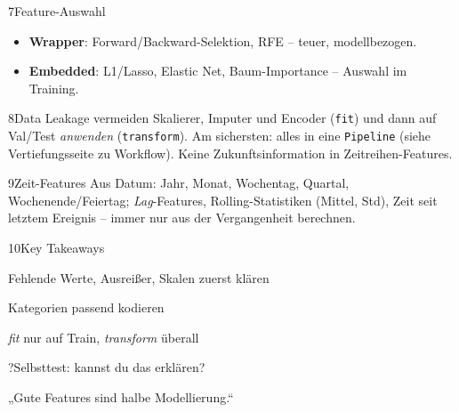 \begin{hngrid}
\begin{hnp}[raster multicolumn=3,acc=hnpurple]{7}{Feature-Auswahl}
\begin{itemize}
\item \textbf{Wrapper}: Forward/Backward-Selektion, RFE -- teuer, modellbezogen.
\item \textbf{Embedded}: L1/Lasso, Elastic Net, Baum-Importance -- Auswahl im Training.
\end{itemize}
\end{hnp}
%
\begin{hnp}[raster multicolumn=3,acc=hnred]{8}{Data Leakage vermeiden}
Skalierer, Imputer und Encoder  (\texttt{fit}) und dann auf Val/Test \emph{anwenden} (\texttt{transform}). Am sichersten: alles in eine \texttt{Pipeline} (siehe Vertiefungsseite zu Workflow). Keine Zukunftsinformation in Zeitreihen-Features.
\end{hnp}
%
\begin{hnp}[raster multicolumn=3,acc=hnteal]{9}{Zeit-Features}
Aus Datum: Jahr, Monat, Wochentag, Quartal, Wochenende/Feiertag; \emph{Lag}-Features, Rolling-Statistiken (Mittel, Std), Zeit seit letztem Ereignis -- immer nur aus der Vergangenheit berechnen.
\end{hnp}
%
\begin{hnp}[raster multicolumn=3,acc=hnorange]{10}{Key Takeaways}
\begin{hnchk}
\item Fehlende Werte, Ausreißer, Skalen zuerst klären
\item Kategorien passend kodieren
\item \emph{fit} nur auf Train, \emph{transform} überall
\end{hnchk}
\end{hnp}
%
\begin{hnp}[raster multicolumn=6,acc=hnpurple,colback=hnlilac!30]{?}{Selbsttest: kannst du das erklären?}
\end{hnp}
%
\begin{hnbanner}[raster multicolumn=6]
„Gute Features sind halbe Modellierung.“
\end{hnbanner}
\end{hngrid}
